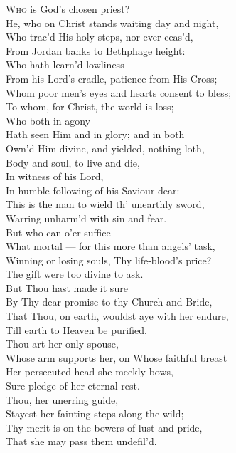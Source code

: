 \textsc{Who} is God’s chosen priest? \\
 He, who on Christ stands waiting day and night, \\
 Who trac’d His holy steps, nor ever ceas’d, \\
 From Jordan banks to Bethphage height: \\
  Who hath learn’d lowliness \\
 From his Lord’s cradle, patience from His Cross; \\
 Whom poor men’s eyes and hearts consent to bless; \\
 To whom, for Christ, the world is loss; \\
  Who both in agony \\
 Hath seen Him and in glory; and in both \\
 Own’d Him divine, and yielded, nothing loth, \\
 Body and soul, to live and die, \\
  In witness of his Lord, \\
 In humble following of his Saviour dear: \\
 This is the man to wield th’ unearthly sword, \\
 Warring unharm’d with sin and fear. \\
  But who can o’er suffice — \\
 What mortal — for this more than angels’ task, \\
 Winning or losing souls, Thy life-blood’s price? \\
 The gift were too divine to ask. \\
  But Thou hast made it sure \\
 By Thy dear promise to thy Church and Bride, \\
 That Thou, on earth, wouldst aye with her endure, \\
 Till earth to Heaven be purified. \\
  Thou art her only spouse, \\
 Whose arm supports her, on Whose faithful breast \\
 Her persecuted head she meekly bows, \\
 Sure pledge of her eternal rest. \\
  Thou, her unerring guide, \\
 Stayest her fainting steps along the wild; \\
 Thy merit is on the bowers of lust and pride, \\
 That she may pass them undefil’d. \\
